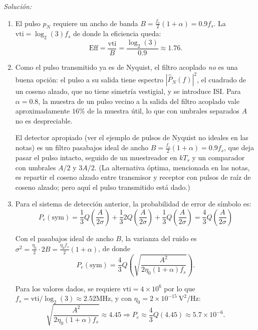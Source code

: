 \documentclass[a4paper,11pt]{article}
\newenvironment{solucion}[1][]{
\noindent \large \textsl{Solución:} \ifthenelse{\equal{#1}{}}{}{\emph{(#1)}}

\smallskip
}{
\bigskip
}
\begin{document}
\begin{solucion}
\begin{enumerate}
        \item El pulso $p_N$ requiere un ancho de banda $B = \frac{f_s}{2}(1+\alpha) = 0.9f_s$. La $\mathrm{vti} = \log_2(3)f_s$ de donde la eficiencia queda:
        \begin{equation*}
                \mathrm{Eff} = \frac{\mathrm{vti}}{B} = \frac{\log_2(3)}{0.9} \approx 1.76.
        \end{equation*}

        \item Como el pulso transmitido ya es de Nyquist, el filtro acoplado \emph{no} es una buena opción: el pulso a su salida tiene espectro $|\hat P_N(f)|^2$, el cuadrado de un coseno alzado, que no tiene simetría vestigial, y se introduce ISI. Para $\alpha=0.8$, la muestra de un pulso vecino a la salida del filtro acoplado vale aproximadamente $16\%$ de la muestra útil, lo que con umbrales separados $A$ no es despreciable.

        El detector apropiado (ver el ejemplo de pulsos de Nyquist no ideales en las notas) es un filtro pasabajos ideal de ancho $B=\frac{f_s}{2}(1+\alpha)=0.9f_s$, que deja pasar el pulso intacto, seguido de un muestreador en $kT_s$ y un comparador con umbrales $A/2$ y $3A/2$. (La alternativa óptima, mencionada en las notas, es repartir el coseno alzado entre transmisor y receptor con pulsos de raíz de coseno alzado; pero aquí el pulso transmitido está dado.)

        \item Para el sistema de detección anterior, la probabilidad de error de símbolo es:
        \begin{equation*}
                P_e(\mathrm{sym}) = \frac{1}{3}Q\left(\frac{A}{2\sigma}\right) + \frac{1}{3}2Q\left(\frac{A}{2\sigma}\right) + \frac{1}{3} Q\left(\frac{A}{2\sigma}\right) = \frac{4}{3}Q\left(\frac{A}{2\sigma}\right)
        \end{equation*}

        Con el pasabajos ideal de ancho $B$, la varianza del ruido es $\sigma^2=\frac{\eta_0}{2}\cdot 2B=\frac{\eta_0 f_s}{2}(1+\alpha)$, de donde
        \begin{equation*}
                P_e(\mathrm{sym}) =  \frac{4}{3} Q\left(\sqrt{\frac{A^2}{2\eta_0(1+\alpha)f_s}}\right).
        \end{equation*}

        Para los valores dados, se requiere $\textrm{vti} = 4\times 10^6$ por lo que $f_s = \textrm{vti}/\log_2(3) \approx 2.52 \unit{\mega\hertz}$, y con $\eta_0=2\times10^{-15}\ \unit{\square\volt/\hertz}$:
        \begin{equation*}
                \sqrt{\frac{A^2}{2\eta_0(1+\alpha) f_s}} \approx 4.45 \Rightarrow P_e \approx \frac43 Q(4.45) \approx 5.7 \times 10^{-6}.
        \end{equation*}


\end{enumerate}
\end{solucion}
\end{document}
